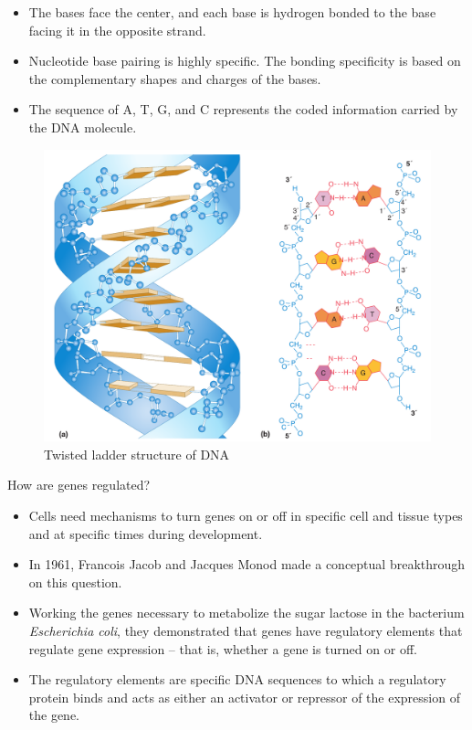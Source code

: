 \documentclass[11pt,dvipsnames,ignorenonframetext,aspectratio=169]{beamer}
\providecommand{\tightlist}{%
  \setlength{\itemsep}{0pt}\setlength{\parskip}{0pt}}
\begin{document}
\begin{frame}{}
\protect\hypertarget{section}{}
\begin{itemize}
\tightlist
\item
  The bases face the center, and each base is hydrogen bonded to the
  base facing it in the opposite strand.
\item
  Nucleotide base pairing is highly specific. The bonding specificity is
  based on the complementary shapes and charges of the bases.
\item
  The sequence of A, T, G, and C represents the coded information
  carried by the DNA molecule.
\end{itemize}

\begin{figure}

{\centering \includegraphics[width=0.38\linewidth]{../images/twisted_ladder_dna} 

}

\caption{Twisted ladder structure of DNA}\label{fig:twisted-ladder}
\end{figure}
\end{frame}

\begin{frame}{How are genes regulated?}
\protect\hypertarget{how-are-genes-regulated}{}
\begin{itemize}
\tightlist
\item
  Cells need mechanisms to turn genes on or off in specific cell and
  tissue types and at specific times during development.
\item
  In 1961, Francois Jacob and Jacques Monod made a conceptual
  breakthrough on this question.
\item
  Working the genes necessary to metabolize the sugar lactose in the
  bacterium \emph{Escherichia coli}, they demonstrated that genes have
  regulatory elements that regulate gene expression -- that is, whether
  a gene is turned on or off.
\item
  The regulatory elements are specific DNA sequences to which a
  regulatory protein binds and acts as either an activator or repressor
  of the expression of the gene.
\end{itemize}
\end{frame}
\end{document}
